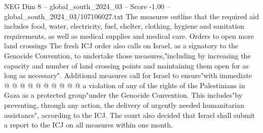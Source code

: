 \begin{textsample}{NEG Dim 8 – global\_south\_2024\_03 – Score -1.00 – global\_south\_2024\_03/107106027.txt}
The measures outline that the required aid includes food, water, electricity, fuel, shelter, clothing, hygiene and sanitation requirements, as well as medical supplies and medical care.
Orders to open more land crossings The fresh ICJ order also calls on Israel, as a signatory to the Genocide Convention, to undertake those measures,"including by increasing the capacity and number of land crossing points and maintaining them open for as long as necessary".
Additional measures call for Israel to ensure"with immediate @ @ @ @ @ @ @ @ @ @ a violation of any of the rights of the Palestinians in Gaza as a protected group"under the Genocide Convention.
This includes"by preventing, through any action, the delivery of urgently needed humanitarian assistance", according to the ICJ.
The court also decided that Israel shall submit a report to the ICJ on all measures within one month.

\end{textsample}
